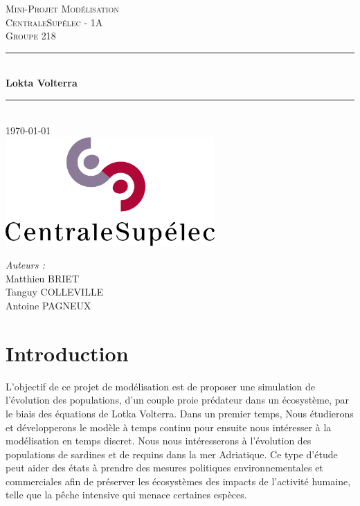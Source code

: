 \documentclass[a4paper, 11pt]{report}%
\begin{document}
    \begin{titlepage}
        \newcommand{\HRule}{\rule{\linewidth}{0.5mm}}
        \begin{center}
            \textsc{\LARGE{} Mini-Projet Modélisation} \\[0.5cm] 
            \textsc{\Large{} CentraleSupélec - 1A} \\[0.5cm]
            \textsc{\large{} Groupe 218} \\[0.5cm] 
            \HRule \\[0.6cm]
            {\huge\bfseries{} Lokta Volterra} \\[0.25cm]
            \HRule \\[1.5cm]
            {\large\today} \\[2cm] 
            \includegraphics[width=8cm]{images/cs.png}
            \\[2cm] 
        \end{center}
        \vfill{}
        \begin{minipage}{0.45\linewidth}
            \begin{flushleft}
                \Large\textit{Auteurs :} \\
                Matthieu \textsc{BRIET} \\
                Tanguy \textsc{COLLEVILLE} \\
                Antoine \textsc{PAGNEUX} 
            \end{flushleft}
        \end{minipage}
    \end{titlepage}

    \tableofcontents
    \listoffigures

    \newpage
    \section{Introduction}
        L'objectif de ce projet de modélisation est de proposer une simulation de l'évolution des populations,  
        d'un couple proie prédateur dans un écosystème, par le biais des équations de Lotka Volterra. Dans un premier temps,
        Nous étudierons et développerons  le modèle à temps continu pour ensuite nous intéresser à la modélisation
        en temps discret. Nous nous intéresserons à l'évolution des populations de sardines et de requins
        dans la mer Adriatique. Ce type d'étude peut aider des états à prendre des mesures politiques environnementales 
        et commerciales afin de préserver les écosystèmes des impacts de l'activité humaine, telle que la pêche intensive
        qui menace certaines espèces. 
\end{document}
